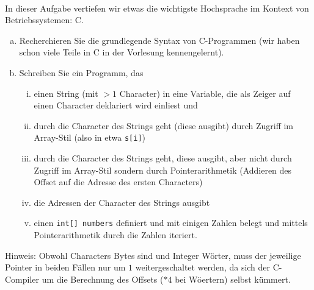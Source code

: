 \\
In dieser Aufgabe vertiefen wir etwas die wichtigste Hochsprache im Kontext von Betriebssystemen: C.
\begin{enumerate}[(a)]
  \item Recherchieren Sie die grundlegende Syntax von C-Programmen (wir haben schon viele Teile in C in der Vorlesung kennengelernt).
  \item Schreiben Sie ein Programm, das 
  \begin{enumerate}[(i)]
    \item einen String (mit $>1$ Character) in eine Variable, die als Zeiger auf einen Character deklariert wird einliest und 
    \item durch die Character des Strings geht (diese ausgibt) durch Zugriff im Array-Stil (also in etwa \texttt{s[i]})
    \item durch die Character des Strings geht, diese ausgibt, aber nicht durch Zugriff im Array-Stil sondern durch Pointerarithmetik (Addieren des Offset auf die Adresse des ersten Characters)
    \item die Adressen der Character des Strings ausgibt
    \item einen \texttt{int[] numbers} definiert und mit einigen Zahlen belegt und mittels Pointerarithmetik durch die Zahlen iteriert.
  \end{enumerate}
\end{enumerate}
  \begin{notes}
    Hinweis: Obwohl Characters Bytes sind und Integer Wörter, muss der jeweilige Pointer in beiden Fällen nur um $1$ weitergeschaltet werden, da sich der C-Compiler um die Berechnung des Offsets ($*4$ bei Wöertern) selbst kümmert.
  \end{notes}



